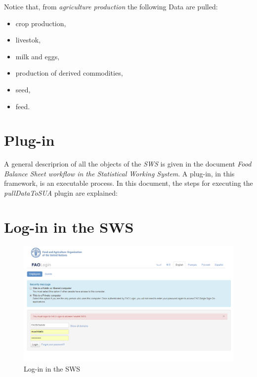 \documentclass[]{article}
\providecommand{\tightlist}{%
  \setlength{\itemsep}{0pt}\setlength{\parskip}{0pt}}
\begin{document}
Notice that, from \emph{agriculture production} the following Data are
pulled:

\begin{itemize}
\tightlist
\item
  crop production,
\item
  livestok,
\item
  milk and eggs,
\item
  production of derived commodities,
\item
  seed,
\item
  feed.
\end{itemize}

\section*{Plug-in}\label{plug-in}

A general descriprion of all the objects of the \emph{SWS} is given in
the document \emph{Food Balance Sheet workflow in the Statistical
Working System}. A plug-in, in this framework, is an executable process.
In this document, the steps for executing the \emph{pullDataToSUA}
plugin are explained:

\section{Log-in in the SWS}\label{log-in-in-the-sws}

\begin{figure}[H]

{\centering \includegraphics[width=1\linewidth]{images/pullData/02_swsLogin} 

}

\caption{\label{fig:f2}Log-in in the SWS}\label{fig:f2}
\end{figure}
\end{document}
